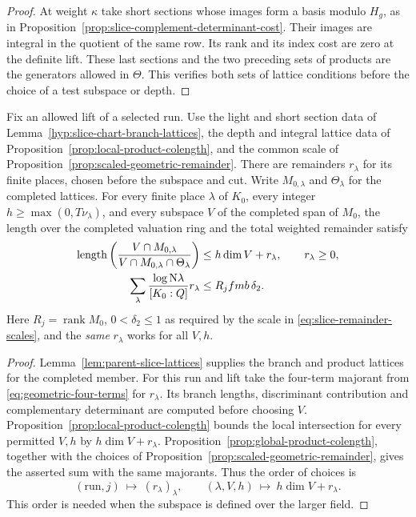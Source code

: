 \begin{proof}
At weight \(\kappa\) take short sections whose images form a
basis modulo \(H_g\), as in Proposition~\ref{prop:slice-complement-determinant-cost}.
Their images are integral in the quotient of the same row. Its
rank and its index cost are zero at the definite lift. These
last sections and the two preceding sets of products are the
generators allowed in \(\Theta\). This verifies both sets of lattice
conditions before the choice of a test subspace or depth.
\end{proof}

\begin{proposition}\label{prop:geometric-run-index}
Fix an allowed lift of a selected run. Use the light and short
section data of Lemma~\ref{hyp:slice-chart-branch-lattices},
the depth and integral lattice data of
Proposition~\ref{prop:local-product-colength}, and the common
scale of Proposition~\ref{prop:scaled-geometric-remainder}. There are
remainders \(r_\lambda\) for its finite places, chosen before the
subspace and cut. Write \(M_{0,\lambda}\) and \(\Theta_\lambda\) for
the completed lattices. For every finite place \(\lambda\) of \(K_0\),
every integer \(h\ge\max(0,T\nu_\lambda)\), and every subspace \(V\) of the
completed span of \(M_0\), the length over the completed valuation ring and the total
weighted remainder satisfy
\begin{equation}\label{eq:geometric-run-index}
 \begin{aligned}
 \operatorname{length}\left(\frac{V\cap M_{0,\lambda}}
          {V\cap M_{0,\lambda}\cap\Theta_\lambda}\right)
     &\le h\dim V+r_\lambda,\qquad r_\lambda\ge0,\\
 \sum_\lambda\frac{\log {\rm N}\lambda}{[K_0:Q]}r_\lambda
     &\le R_j fmb\,\delta_2 .
 \end{aligned}
\end{equation}
Here \(R_j=\operatorname{rank}M_0\), \(0<\delta_2\le1\) as required by the scale in \eqref{eq:slice-remainder-scales},
and the \emph{same} \(r_\lambda\) works for all \(V,h\).
\end{proposition}

\begin{proof}
Lemma~\ref{lem:parent-slice-lattices} supplies the branch and product lattices for the completed member. For this run and lift take the four-term majorant from \eqref{eq:geometric-four-terms} for \(r_\lambda\). Its branch lengths, discriminant contribution and complementary determinant are computed before choosing \(V\). Proposition~\ref{prop:local-product-colength} bounds the local intersection for every permitted \(V,h\) by \(h\dim V+r_\lambda\). Proposition~\ref{prop:global-product-colength}, together with the choices of Proposition~\ref{prop:scaled-geometric-remainder}, gives the asserted sum with the same majorants. Thus the order of choices is
\[
 (\text{run},j)\ \longmapsto\ (r_\lambda)_\lambda,
 \qquad (\lambda,V,h)\ \longmapsto\ h\dim V+r_\lambda .
\]
This order is needed when the subspace is defined over the larger field.
\end{proof} \label{cor:paired-row-indices-2}

